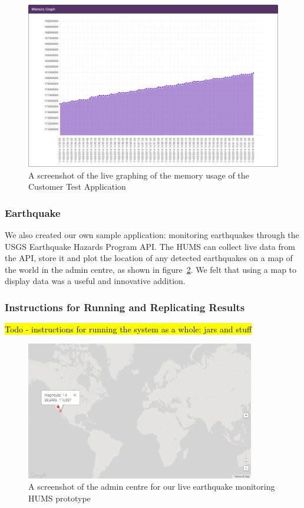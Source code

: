 \documentclass[10pt,a4paper]{article}
\begin{document}
\begin{figure}[htbp!]
  \centering
  \includegraphics[width=12cm]{images/TestApplicationMemoryGraph.png}
  \caption{A screenshot of the live graphing of the memory usage of the Customer 
  Test Application}
  \label{fig:graphing}
\end{figure}

\subsubsection{Earthquake}
We also created our own sample application: monitoring earthquakes 
through the USGS Earthquake Hazards Program API. The HUMS
can collect live data from the API, store it and plot the location of any
detected earthquakes on a map of the world in the admin centre, as shown
in figure~\ref{fig:plotearthquakes}. We felt that using a map to display
data was a useful and innovative addition.

\subsubsection{Instructions for Running and Replicating Results}
\hl{Todo - instructions for running the system as a whole: jars and stuff}

\begin{figure}[htbp!]
  \centering
  \includegraphics[width=10cm]{images/plotearthquakes.png}
  \caption{A screenshot of the admin centre for our live earthquake monitoring HUMS prototype}
  \label{fig:plotearthquakes}
\end{figure}
\end{document}
